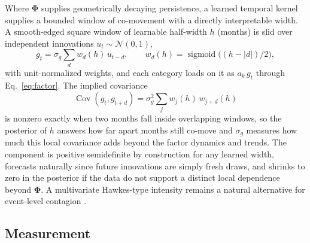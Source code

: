 \documentclass[review]{elsarticle}
\begin{document}
Where $\bm{\Phi}$ supplies geometrically decaying persistence, a learned temporal kernel supplies a bounded window of co-movement with a directly interpretable width. A smooth-edged square window of learnable half-width $h$ (months) is slid over independent innovations $u_t \sim \mathcal{N}(0,1)$,
\begin{equation}\label{eq:kernel}
    g_t = \sigma_g \sum_{d} w_d(h)\, u_{t-d},
    \qquad
    w_d(h) = \operatorname{sigmoid}\!\big((h - |d|)/2\big),
\end{equation}
with unit-normalized weights, and each category loads on it as $a_k\, g_t$ through Eq.~\ref{eq:factor}. The implied covariance
\begin{equation}\label{eq:kernelcov}
    \operatorname{Cov}(g_t, g_{t+d}) = \sigma_g^2 \sum_{j} w_j(h)\, w_{j+d}(h)
\end{equation}
is nonzero exactly when two months fall inside overlapping windows, so the posterior of $h$ answers how far apart months still co-move and $\sigma_g$ measures how much this local covariance adds beyond the factor dynamics and trends. The component is positive semidefinite by construction for any learned width, forecasts naturally since future innovations are simply fresh draws, and shrinks to zero in the posterior if the data do not support a distinct local dependence beyond $\bm{\Phi}$. A multivariate Hawkes-type intensity remains a natural alternative for event-level contagion \citep{bessyroland2021}.

\subsection{Measurement}
\end{document}
